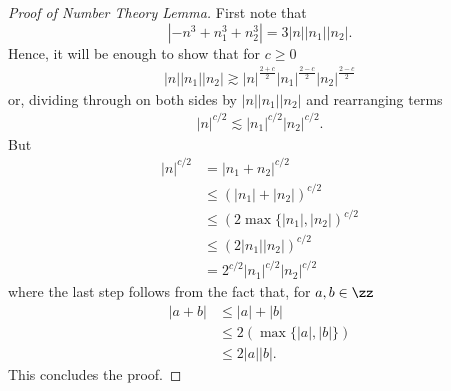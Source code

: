 %
\begin{proof}[Proof of Number Theory Lemma]
First note that
%
\begin{equation*}
		| - n^{3} + n_1^3 + n_2^3|
		 = 3 | n | |n_1 | |n_2 |.
\end{equation*}
%
%
Hence, it will be enough to show that for $c \ge 0$
%
%
\begin{equation*}
	\begin{split}
		| n | |n_1 | |n_2 | \gtrsim | n |^{\frac{2 + c}{2}}| n_1
		|^{\frac{2-c}{2}}| n_2 |^{\frac{2-c}{2}}
	\end{split}
\end{equation*}
%
%
or, dividing through on both sides by $|n| | n_1 | | n_2 |$ and rearranging terms
%
%
\begin{equation*}
	\begin{split}
		| n |^{c/2} \lesssim | n_1 |^{c/2} | n_2 |^{c/2}.
	\end{split}
\end{equation*}
%
%
But
%
%
\begin{equation*}
	\begin{split}
		| n |^{c/2} &= | n_1 + n_2 |^{c/2}
		\\
		& \le (| n_1 | + |n_2|)^{c/2} 
		\\
		& \le (2\max\{|
		n_1 |, | n_2 |)^{c/2}
		\\
		& \le (2|
		n_1 | | n_2 |)^{c/2}
		\\
		& = 2^{c/2} | n_1 |^{c/2} | n_2 |^{c/2}
	\end{split}
\end{equation*}
%
%
where the last step follows from the fact that, for $a, b \in \zz$ 
%
\begin{equation}
	\label{16a}
	\begin{split}
		| a + b | 
		& \le | a | + | b | 
		\\
		& \le 2\left( \max\{| a |, | b | \}\right)
		\\
		& \le 2 |a| |b|.
	\end{split}
\end{equation} 
This concludes the proof.
\end{proof}
%
